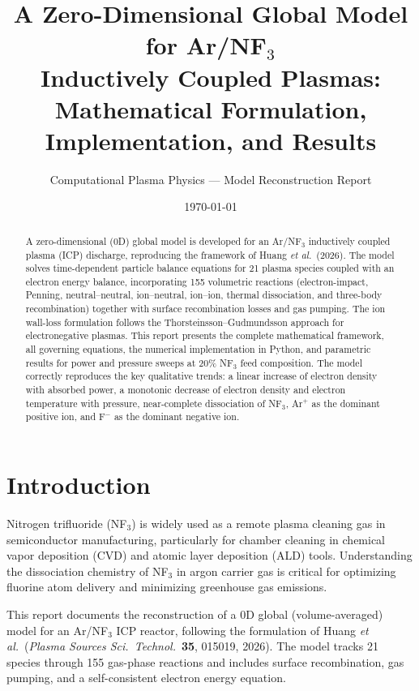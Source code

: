 \documentclass[11pt,a4paper]{article}
\title{\bfseries A Zero-Dimensional Global Model for Ar/NF$_3$\\
  Inductively Coupled Plasmas:\\
  Mathematical Formulation, Implementation, and Results}
\author{Computational Plasma Physics --- Model Reconstruction Report}
\date{\today}
\begin{document}
\maketitle

\begin{abstract}
  A zero-dimensional (0D) global model is developed for an Ar/NF$_3$ inductively
  coupled plasma (ICP) discharge, reproducing the framework of Huang \textit{et al.}\
  (2026). The model solves time-dependent particle balance equations for 21 plasma
  species coupled with an electron energy balance, incorporating 155 volumetric
  reactions (electron-impact, Penning, neutral--neutral, ion--neutral, ion--ion,
  thermal dissociation, and three-body recombination) together with surface
  recombination losses and gas pumping.  The ion wall-loss formulation follows the
  Thorsteinsson--Gudmundsson approach for electronegative plasmas.  This report
  presents the complete mathematical framework, all governing equations, the
  numerical implementation in Python, and parametric results for power and pressure
  sweeps at 20\% NF$_3$ feed composition.  The model correctly reproduces the key
  qualitative trends: a linear increase of electron density with absorbed power, a
  monotonic decrease of electron density and electron temperature with pressure, near-complete
  dissociation of NF$_3$, Ar$^+$ as the dominant positive ion, and F$^-$ as the
  dominant negative ion.
\end{abstract}

\tableofcontents
\newpage

\section{Introduction}
\label{sec:intro}

Nitrogen trifluoride (NF$_3$) is widely used as a remote plasma cleaning gas in
semiconductor manufacturing, particularly for chamber cleaning in chemical vapor
deposition (CVD) and atomic layer deposition (ALD) tools. Understanding the
dissociation chemistry of NF$_3$ in argon carrier gas is critical for optimizing
fluorine atom delivery and minimizing greenhouse gas emissions.

This report documents the reconstruction of a 0D global (volume-averaged) model
for an Ar/NF$_3$ ICP reactor, following the formulation of Huang \textit{et al.}\
(\textit{Plasma Sources Sci.\ Technol.}\ \textbf{35}, 015019, 2026). The model
tracks 21 species through 155 gas-phase reactions and includes surface
recombination, gas pumping, and a self-consistent electron energy equation.
\end{document}

